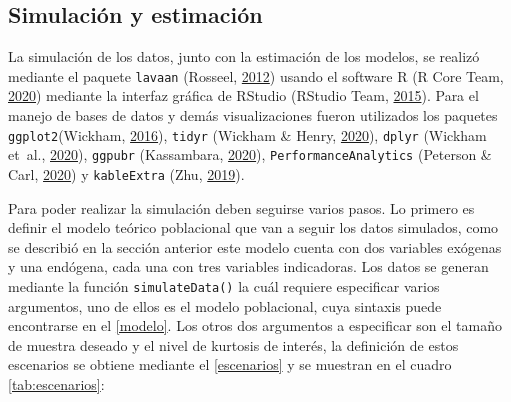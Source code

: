 \documentclass[
]{article}
\begin{document}
\subsection{Simulación y estimación}

La simulación de los datos, junto con la estimación de los modelos, se
realizó mediante el paquete \texttt{lavaan} (Rosseel,
\protect\hyperlink{ref-lavaan}{2012}) usando el software R (R Core Team,
\protect\hyperlink{ref-R}{2020}) mediante la interfaz gráfica de RStudio
(RStudio Team, \protect\hyperlink{ref-RStudio}{2015}). Para el manejo de
bases de datos y demás visualizaciones fueron utilizados los paquetes
\texttt{ggplot2}(Wickham, \protect\hyperlink{ref-ggplot2}{2016}),
\texttt{tidyr} (Wickham \& Henry, \protect\hyperlink{ref-tidyr}{2020}),
\texttt{dplyr} (Wickham et~al., \protect\hyperlink{ref-dplyr}{2020}),
\texttt{ggpubr} (Kassambara, \protect\hyperlink{ref-ggpubr}{2020}),
\texttt{PerformanceAnalytics} (Peterson \& Carl,
\protect\hyperlink{ref-PerformanceAnalytics}{2020}) y
\texttt{kableExtra} (Zhu, \protect\hyperlink{ref-kableExtra}{2019}).

Para poder realizar la simulación deben seguirse varios pasos. Lo
primero es definir el modelo teórico poblacional que van a seguir los
datos simulados, como se describió en la sección anterior este modelo
cuenta con dos variables exógenas y una endógena, cada una con tres
variables indicadoras. Los datos se generan mediante la función
\texttt{simulateData()} la cuál requiere especificar varios argumentos,
uno de ellos es el modelo poblacional, cuya sintaxis puede encontrarse
en el \ref{modelo}. Los otros dos argumentos a especificar son el tamaño
de muestra deseado y el nivel de kurtosis de interés, la definición de
estos escenarios se obtiene mediante el \ref{escenarios} y se muestran
en el cuadro \ref{tab:escenarios}:
\end{document}

